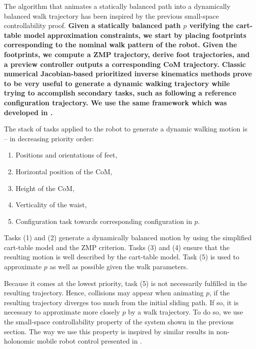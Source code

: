 \documentclass{article}
\begin{document}
The algorithm that animates a statically balanced path into a
dynamically balanced walk trajectory has been inspired by the previous
small-space controllability proof. \textbf{Given a statically balanced
  path $p$ verifying the cart-table model approximation constraints,
  we start by placing footprints corresponding to the nominal walk
  pattern of the robot. Given the footprints, we compute a ZMP
  trajectory, derive foot trajectories, and a preview controller
  outputs a corresponding CoM trajectory. Classic numerical
  Jacobian-based prioritized inverse kinematics methods prove to be
  very useful to generate a dynamic walking trajectory while trying to
  accomplish secondary tasks, such as following a reference
  configuration trajectory. We use the same framework which was
  developed in \cite{yoshida2006tds}.}

The stack of tasks applied to the robot to generate a dynamic walking
motion is -- in decreasing priority order:

\begin{enumerate}

\item Positions and orientations of  feet,

\item Horizontal position of the CoM,

\item Height of the CoM,

\item Verticality of the waist,

\item Configuration task towards corresponding
  configuration  in $p$.

\end{enumerate}

Tasks (1)  and (2) generate a  dynamically balanced motion  by using the
simplified cart-table model  and the ZMP criterion. Tasks  (3) and (4)
ensure that the  resulting motion is well described  by the cart-table
model. Task (5)  is used to approximate $p$ as  well as possible given
the walk parameters.

Because it comes at the  lowest priority, task (5) is not necessarily
fulfilled in  the resulting trajectory. Hence,  collisions may appear
when animating $p$, if the resulting trajectory diverges too much from
the initial sliding  path. If so, it is  necessary to approximate more
closely $p$  by a walk  trajectory.  To do  so, we use  the small-space
controllability  property   of  the  system  shown   in  the  previous
section. The way  we use this property is  inspired by similar results
in non-holonomic mobile robot control presented in \cite{taix-94}.
\end{document}
